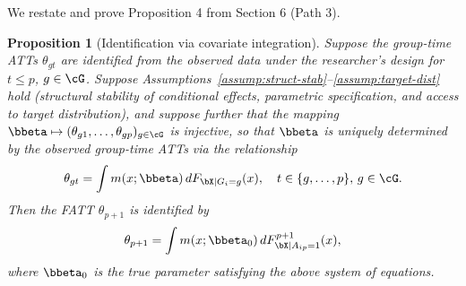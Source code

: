\documentclass{article}
\newtheorem*{proposition*}{Proposition}
\begin{document}
We restate and prove Proposition 4 from Section 6 (Path 3).

\begin{proposition*}[Identification via covariate integration]
Suppose the group-time ATTs $\theta_{gt}$ are identified from the observed data under the researcher's design for $t \leq p$, $g \in \cG$. Suppose Assumptions~\ref{assump:struct-stab}--\ref{assump:target-dist} hold (structural stability of conditional effects, parametric specification, and access to target distribution), and suppose further that the mapping $\bbeta \mapsto (\theta_{g1}, \ldots, \theta_{gp})_{g \in \cG}$ is injective, so that $\bbeta$ is uniquely determined by the observed group-time ATTs via the relationship
\[
\theta_{gt} = \int m(x; \bbeta) \, dF_{\bX | G_i=g}(x), \quad t \in \{g,\ldots,p\}, \, g \in \cG.
\]
Then the FATT $\theta_{p+1}$ is identified by
\[
\theta_{p+1} = \int m(x; \bbeta_0) \, dF_{\bX | A_{ip}=1}^{p+1}(x),
\]
where $\bbeta_0$ is the true parameter satisfying the above system of equations.
\end{proposition*}
\end{document}
